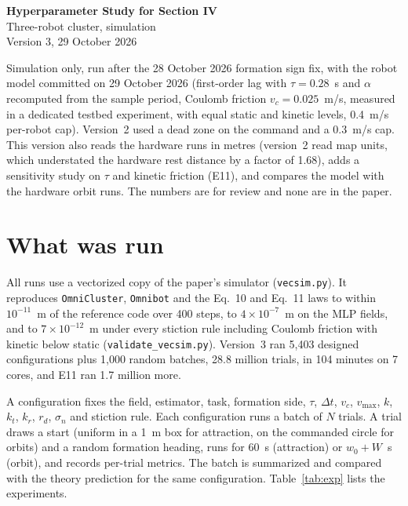 \documentclass[10pt,letterpaper]{article}
\newcommand{\vmax}{v_{\max}}
\newcommand{\dt}{\Delta t}
\begin{document}
\begin{center}
{\LARGE\sffamily\bfseries Hyperparameter Study for Section IV}\\[4pt]
{\large\sffamily Three-robot cluster, simulation}\\[4pt]
Version 3, 29 October 2026
\end{center}

\begin{center}
\begin{minipage}{0.86\textwidth}
\small Simulation only, run after the 28 October 2026 formation sign fix, with the robot model committed on 29 October 2026 (first-order lag with $\tau = 0.28$~s and $\alpha$ recomputed from the sample period, Coulomb friction $v_c = 0.025$~m/s, measured in a dedicated testbed experiment, with equal static and kinetic levels, 0.4~m/s per-robot cap). Version~2 used a dead zone on the command and a 0.3~m/s cap. This version also reads the hardware runs in metres (version~2 read map units, which understated the hardware rest distance by a factor of 1.68), adds a sensitivity study on $\tau$ and kinetic friction (E11), and compares the model with the hardware orbit runs. The numbers are for review and none are in the paper.
\end{minipage}
\end{center}

\section*{What was run}

All runs use a vectorized copy of the paper's simulator (\texttt{vecsim.py}). It reproduces \texttt{OmniCluster}, \texttt{Omnibot} and the Eq.~10 and Eq.~11 laws to within $10^{-11}$~m of the reference code over 400 steps, to $4\times10^{-7}$~m on the MLP fields, and to $7\times10^{-12}$~m under every stiction rule including Coulomb friction with kinetic below static (\texttt{validate\_vecsim.py}). Version~3 ran 5,403 designed configurations plus 1,000 random batches, 28.8 million trials, in 104 minutes on 7 cores, and E11 ran 1.7 million more.

A configuration fixes the field, estimator, task, formation side, $\tau$, $\dt$, $v_c$, $\vmax$, $k$, $k_t$, $k_r$, $r_d$, $\sigma_n$ and stiction rule. Each configuration runs a batch of $N$ trials. A trial draws a start (uniform in a 1~m box for attraction, on the commanded circle for orbits) and a random formation heading, runs for 60~s (attraction) or $w_0 + W$~s (orbit), and records per-trial metrics. The batch is summarized and compared with the theory prediction for the same configuration. Table~\ref{tab:exp} lists the experiments.
\end{document}
